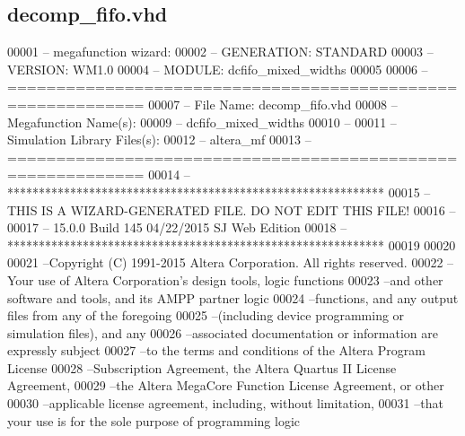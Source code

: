 \subsection{decomp\+\_\+fifo.\+vhd}
\label{decomp__fifo_8vhd_source}

\begin{DoxyCode}
00001 \textcolor{keyword}{-- megafunction wizard: %
00002 \textcolor{keyword}{-- GENERATION: STANDARD}
00003 \textcolor{keyword}{-- VERSION: WM1.0}
00004 \textcolor{keyword}{-- MODULE: dcfifo\_mixed\_widths }
00005 
00006 \textcolor{keyword}{-- ============================================================}
00007 \textcolor{keyword}{-- File Name: decomp\_fifo.vhd}
00008 \textcolor{keyword}{-- Megafunction Name(s):}
00009 \textcolor{keyword}{--          dcfifo\_mixed\_widths}
00010 \textcolor{keyword}{--}
00011 \textcolor{keyword}{-- Simulation Library Files(s):}
00012 \textcolor{keyword}{--          altera\_mf}
00013 \textcolor{keyword}{-- ============================================================}
00014 \textcolor{keyword}{-- ************************************************************}
00015 \textcolor{keyword}{-- THIS IS A WIZARD-GENERATED FILE. DO NOT EDIT THIS FILE!}
00016 \textcolor{keyword}{--}
00017 \textcolor{keyword}{-- 15.0.0 Build 145 04/22/2015 SJ Web Edition}
00018 \textcolor{keyword}{-- ************************************************************}
00019 
00020 
00021 \textcolor{keyword}{--Copyright (C) 1991-2015 Altera Corporation. All rights reserved.}
00022 \textcolor{keyword}{--Your use of Altera Corporation's design tools, logic functions }
00023 \textcolor{keyword}{--and other software and tools, and its AMPP partner logic }
00024 \textcolor{keyword}{--functions, and any output files from any of the foregoing }
00025 \textcolor{keyword}{--(including device programming or simulation files), and any }
00026 \textcolor{keyword}{--associated documentation or information are expressly subject }
00027 \textcolor{keyword}{--to the terms and conditions of the Altera Program License }
00028 \textcolor{keyword}{--Subscription Agreement, the Altera Quartus II License Agreement,}
00029 \textcolor{keyword}{--the Altera MegaCore Function License Agreement, or other }
00030 \textcolor{keyword}{--applicable license agreement, including, without limitation, }
00031 \textcolor{keyword}{--that your use is for the sole purpose of programming logic }
}
\end{DoxyCode}
